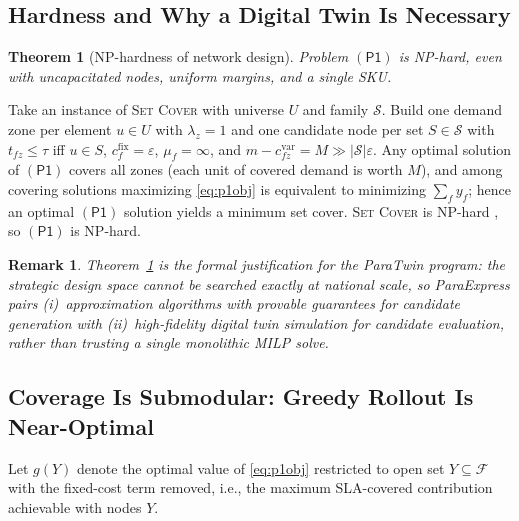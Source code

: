 \documentclass[journal]{IEEEtran}
\newtheorem{theorem}{Theorem}
\newtheorem{remark}{Remark}
\begin{document}
\subsection{Hardness and Why a Digital Twin Is Necessary}

\begin{theorem}[NP-hardness of network design]
\label{thm:nphard}
Problem $(\mathsf{P1})$ is NP-hard, even with uncapacitated nodes, uniform margins, and a single SKU.
\end{theorem}
\begin{IEEEproof}
Take an instance of \textsc{Set Cover} with universe $U$ and family $\mathcal{S}$. Build one demand zone per element $u \in U$ with $\lambda_z = 1$ and one candidate node per set $S \in \mathcal{S}$ with $t_{fz} \le \tau$ iff $u \in S$, $c^{\mathrm{fix}}_f = \varepsilon$, $\mu_f = \infty$, and $m - c^{\mathrm{var}}_{fz} = M \gg |\mathcal{S}|\varepsilon$. Any optimal solution of $(\mathsf{P1})$ covers all zones (each unit of covered demand is worth $M$), and among covering solutions maximizing \eqref{eq:p1obj} is equivalent to minimizing $\sum_f y_f$; hence an optimal $(\mathsf{P1})$ solution yields a minimum set cover. \textsc{Set Cover} is NP-hard \cite{gareyjohnson}, so $(\mathsf{P1})$ is NP-hard.
\end{IEEEproof}

\begin{remark}
Theorem~\ref{thm:nphard} is the formal justification for the ParaTwin program: the strategic design space cannot be searched exactly at national scale, so ParaExpress pairs (i)~approximation algorithms with provable guarantees for candidate generation with (ii)~high-fidelity digital twin simulation for candidate evaluation, rather than trusting a single monolithic MILP solve.
\end{remark}

\subsection{Coverage Is Submodular: Greedy Rollout Is Near-Optimal}

Let $g(Y)$ denote the optimal value of \eqref{eq:p1obj} restricted to open set $Y \subseteq \mathcal{F}$ with the fixed-cost term removed, i.e., the maximum SLA-covered contribution achievable with nodes $Y$.
\end{document}

